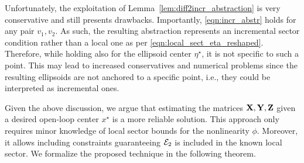 \documentclass{ifacconf}
\begin{document}
Unfortunately, the exploitation of Lemma~\ref{lem:diff2incr_abstraction} is very conservative and still presents drawbacks. Importantly, \eqref{eqn:incr_abstr} holds for any pair $v_1,v_2$. As such, the resulting abstraction represents an incremental sector condition rather than a local one as per \eqref{eqn:local_sect_eta_reshaped}. Therefore, while holding also for the ellipsoid center $\eta^\star$, it is not specific to such a point. This may lead to increased conservatives and numerical problems since the resulting ellipsoids are not anchored to a specific point, i.e., they could be interpreted as incremental ones.

Given the above discussion, we argue that estimating the matrices ${\bf{X}},{\bf{Y}},{\bf{Z}}$ given a desired open-loop center $x^\star$ is a more reliable solution. This approach only requires minor knowledge of local sector bounds for the nonlinearity $\phi$. Moreover, it allows including constraints guaranteeing ${\mathcal{E}}_2$ is included in the known local sector. We formalize the proposed technique in the following theorem.
\end{document}
